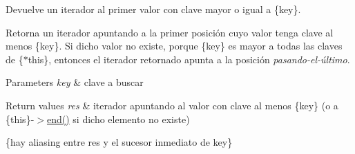 \-Devuelve un iterador al primer valor con clave mayor o igual a \{key\}. 

\-Retorna un iterador apuntando a la primer posición cuyo valor tenga clave al menos \{key\}. \-Si dicho valor no existe, porque \{key\} es mayor a todas las claves de \{$\ast$this\}, entonces el iterador retornado apunta a la posición {\itshape pasando-\/el-\/último\/}.


\begin{DoxyParams}{\-Parameters}
{\em key} & clave a buscar \\
\hline
\end{DoxyParams}

\begin{DoxyRetVals}{\-Return values}
{\em res} & iterador apuntando al valor con clave al menos \{key\} (o a \{this\}-\/$>$\hyperlink{classaed2_1_1iterator_a67caf9468be999e9be96b7add5d79946}{end()} si dicho elemento no existe)\\
\hline
\end{DoxyRetVals}
\{hay aliasing entre res y el sucesor inmediato de key\}

